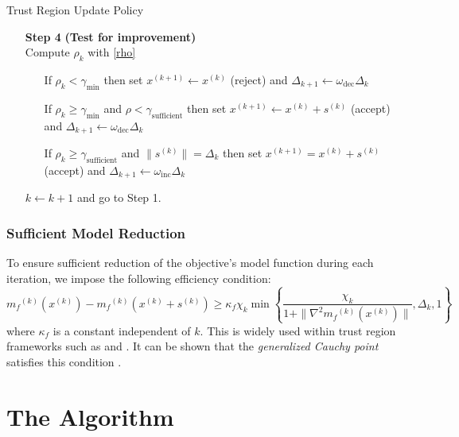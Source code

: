 \documentclass{article}
\theoremstyle{case}
\newcommand{\modelk}{{{m}_f}^{(k)}}
\newcommand{\iteratek}{{x}^{(k)}}
\newcommand{\trialk}{{{s}^{(k)}}}
\newcommand{\iteratekpone}{{x}^{(k+1)}}
\newcommand{\omegainc}{\omega_{\text{inc}}}
\newcommand{\omegadec}{\omega_{\text{dec}}}
\newcommand{\gammasm}{\gamma_{\text{min}}}
\newcommand{\gammabi}{\gamma_{\text{sufficient}}}
\newcommand{\dk}{\Delta_k}
\begin{document}
\begin{algorithm}[H]
    \caption{Trust Region Update Policy}
    \label{trust_region_update}
    \begin{itemize}
        \item[\textbf{Step 4}] \textbf{(Test for improvement)} \\
            Compute $\rho_k$ with \cref{rho} \begin{itemize}
                \item[] If $\rho_k < \gammasm$ then set $\iteratekpone \gets \iteratek$ (reject) and $\Delta_{k+1} \gets \omegadec\Delta_{k}$
                \item[] If $\rho_k \ge \gammasm$ and $\rho < \gammabi$ then set $\iteratekpone\gets\iteratek+\trialk$ (accept) and $\Delta_{k+1} \gets \omegadec\Delta_{k}$
                \item[] If $\rho_k \ge \gammabi$ and $\|\trialk\| = \Delta_{k}$ then set $\iteratekpone=\iteratek+\trialk$ (accept) and $\Delta_{k+1} \gets \omegainc\Delta_{k}$
            \end{itemize}
            $k \gets k+1$ and go to Step 1.
    \end{itemize}
\end{algorithm}

\subsubsection{Sufficient Model Reduction}

To ensure sufficient reduction of the objective's model function during each iteration, we impose the following efficiency condition:
\begin{equation}
\label{efficiency}
\modelk(\iteratek) - \modelk(\iteratek + \trialk) \ge \kappa_f \chi_k \min\left\{ \frac{\chi_k}{1+\|\nabla^2 \modelk(\iteratek)\|}, \dk, 1 \right\}
\end{equation}
where $\kappa_f$ is a constant independent of $k$.
This is widely used within trust region frameworks such as \cite{Conejo:2013:GCT:2620806.2621814} and \cite{Conn:2000:TM:357813}.
It can be shown that the \emph{generalized Cauchy point} satisfies this condition \cite{Conn:2000:TM:357813}.



\section{The Algorithm}
\end{document}
